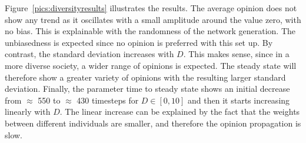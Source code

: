 Figure~\ref{pics:diversityresults} illustrates the results. The average opinion does not show any trend as it oscillates with a small amplitude around the value zero, with no bias. This is explainable with the randomness of the network generation. The unbiasedness is expected since no opinion is preferred with this set up. By contrast, the standard deviation increases with $D$. This makes sense, since in a more diverse society, a wider range of opinions is expected. The steady state will therefore show a greater variety of opinions with the resulting larger standard deviation. Finally, the parameter time to steady state shows an initial decrease from $\approx$ 550 to $\approx$ 430 timesteps for $D \in [0,10]$ and then it starts increasing linearly with $D$. The linear increase can be explained by the fact that the weights between different individuals are smaller, and therefore the opinion propagation is slow.

